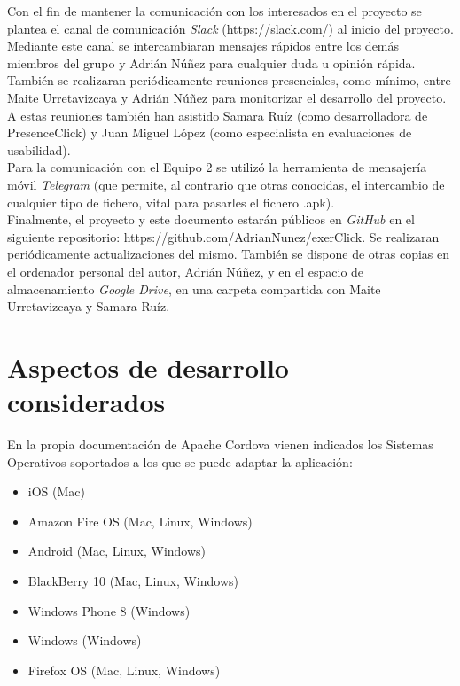 Con el fin de mantener la comunicación con los interesados en el proyecto se plantea el canal de comunicación \textit{Slack} (https://slack.com/) al inicio del proyecto. Mediante este canal se intercambiaran mensajes rápidos entre los demás miembros del grupo y Adrián Núñez para cualquier duda u opinión rápida.\\

También se realizaran periódicamente reuniones presenciales, como mínimo, entre Maite Urretavizcaya y Adrián Núñez para monitorizar el desarrollo del proyecto. A estas reuniones también han asistido Samara Ruíz (como desarrolladora de PresenceClick) y Juan Miguel López (como especialista en evaluaciones de usabilidad).\\

Para la comunicación con el Equipo 2 se utilizó la herramienta de mensajería móvil \textit{Telegram} (que permite, al contrario que otras conocidas, el intercambio de cualquier tipo de fichero, vital para pasarles el fichero .apk).\\

Finalmente, el proyecto y este documento estarán públicos en \textit{GitHub} en el siguiente repositorio: https://github.com/AdrianNunez/exerClick. Se realizaran periódicamente actualizaciones del mismo. También se dispone de otras copias en el ordenador personal del autor, Adrián Núñez, y en el espacio de almacenamiento \textit{Google Drive}, en una carpeta compartida con Maite Urretavizcaya y Samara Ruíz.\\

\section{Aspectos de desarrollo considerados}
\label{aspectos-de-desarrollo-considerados}

En la propia documentación de Apache Cordova vienen indicados los Sistemas Operativos soportados a los que se puede adaptar la aplicación:

\begin{itemize}
\item iOS (Mac)
\item Amazon Fire OS (Mac, Linux, Windows)
\item Android (Mac, Linux, Windows)
\item BlackBerry 10 (Mac, Linux, Windows)
\item Windows Phone 8 (Windows)
\item Windows (Windows)
\item Firefox OS (Mac, Linux, Windows)
\end{itemize}

